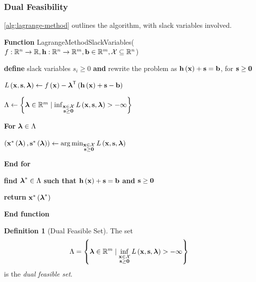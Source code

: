 \documentclass[11pt]{article}
\theoremstyle{definition}
\newtheorem{definition}[theorem]{Definition}
\theoremstyle{remark}
\newcommand{\pqty}[1]{\left(#1\right)}
\newcommand{\set}[2]{\left\{#1\mid #2\right\}}
\newcommand{\functiondomain}[3]{#1:#2\to #3}
\newcommand{\RR}{\mathbb{R}}
\newcommand{\transpose}{^{\mathsf{T}}}
\newcommand{\minusinfty}{-\infty}
\DeclareMathOperator*{\argmin}{arg\,min}
\newenvironment{algorithmic}{\begin{list}{}{\setlength{\leftmargin}{1em}\setlength{\itemsep}{2pt}}}{\end{list}}
\newcommand{\State}{\item[]}
\newcommand{\Function}[2]{\item[]\textbf{Function }#1(#2)}
\newcommand{\EndFunction}{\item[]\textbf{End function}}
\newcommand{\Return}{\textbf{return } }
\newcommand{\For}[1]{\item[]\textbf{For }#1}
\newcommand{\EndFor}{\item[]\textbf{End for}}
\begin{document}
\subsubsection{Dual Feasibility}

\autoref{alg:lagrange-method} outlines the algorithm, with slack variables involved.

\begin{algorithm}[ht!]
    \caption{Lagrange Method with Slack Variables}\label{alg:lagrange-method}%
    \begin{algorithmic}
        \Function{LagrangeMethodSlackVariables}{\(\functiondomain{f}{\RR^n}{\RR}, \functiondomain{\vb{h}}{\RR^n}{\RR^m}, \vb{b} \in \RR^m, \mathcal{X} \subseteq \RR^n\)}
        
        \State \textbf{define} slack variables \(s_i \geq 0\) \textbf{and} rewrite the problem as \(\vb{h} \pqty{\vb{x}} + \vb{s} = \vb{b}\), for \(\vb{s} \geq \vb{0}\)

        \State \(L\pqty{\vb{x}, \vb{s}, \vb*{\lambda}} \gets f\pqty{\vb{x}} - \vb*{\lambda} \transpose \pqty{\vb{h}\pqty{\vb{x}} + \vb{s} - \vb{b}}\)

        \State \(\Lambda \gets \set{\vb*{\lambda} \in \RR^m}{\inf_{\substack{\vb{x} \in \mathcal{X} \\ \vb{s} \geq \vb{0}}} L\pqty{\vb{x}, \vb{s}, \vb*{\lambda}} > \minusinfty}\)

        \For{\(\vb*{\lambda} \in \Lambda\)}
            \State \(\pqty{\vb{x}^{\ast} \pqty{\vb*{\lambda}}, \vb{s}^{\ast} \pqty{\vb*{\lambda}}} \gets \argmin_{\substack{\vb{x} \in \mathcal{X} \\ \vb{s} \geq \vb{0}}} L \pqty{\vb{x}, \vb{s}, \vb*{\lambda}}\)
        \EndFor

        \State \textbf{find} \(\vb*{\lambda}^{\ast} \in \Lambda\) \textbf{such that} \(\vb{h} \pqty{\vb{x}} + \vb{s} = \vb{b}\) \textbf{and} \(\vb{s} \geq \vb{0}\)

        \State \Return{\(\vb{x}^{\ast} \pqty{\vb*{\lambda}^{\ast}}\)}

        \EndFunction
    \end{algorithmic}
\end{algorithm}

\begin{definition}[Dual Feasible Set]\label{optim-unit-0027}
    The set
    \[
        \Lambda = \set{\vb*{\lambda} \in \RR^m}{\inf_{\substack{\vb{x} \in \mathcal{X} \\ \vb{s} \geq \vb{0}}} L\pqty{\vb{x}, \vb{s}, \vb*{\lambda}} > \minusinfty}
    \]
    is the \emph{dual feasible set}.
\end{definition}
\end{document}
